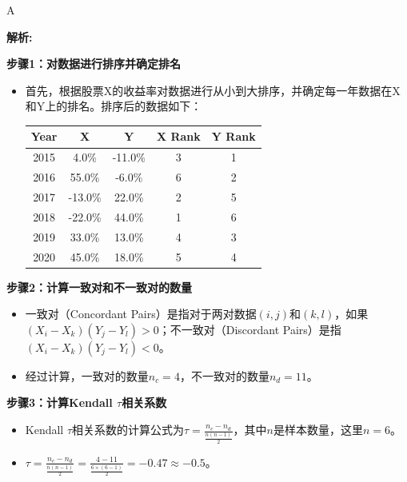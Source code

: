 \documentclass{article}
\newenvironment{explanation}
{\textbf{解析:}\par}
{\par}
\begin{document}
        \begin{correctanswer}
            A
        \end{correctanswer}
        
        \begin{explanation}
        \textbf{步骤1：对数据进行排序并确定排名}
        \begin{itemize}
            \item 首先，根据股票X的收益率对数据进行从小到大排序，并确定每一年数据在X和Y上的排名。排序后的数据如下：
            \begin{center}
                \begin{tabular}{|c|c|c|c|c|}
                \hline
                Year & X & Y & X Rank & Y Rank \\
                \hline
                2015 & 4.0\% & -11.0\% & 3 & 1 \\
                \hline
                2016 & 55.0\% & -6.0\% & 6 & 2 \\
                \hline
                2017 & -13.0\% & 22.0\% & 2 & 5 \\
                \hline
                2018 & -22.0\% & 44.0\% & 1 & 6 \\
                \hline
                2019 & 33.0\% & 13.0\% & 4 & 3 \\
                \hline
                2020 & 45.0\% & 18.0\% & 5 & 4 \\
                \hline
                \end{tabular}
            \end{center}
        \end{itemize}
        \textbf{步骤2：计算一致对和不一致对的数量}
        \begin{itemize}
            \item 一致对（Concordant Pairs）是指对于两对数据$(i, j)$和$(k, l)$，如果$(X_i - X_k)(Y_j - Y_l)>0$；不一致对（Discordant Pairs）是指$(X_i - X_k)(Y_j - Y_l)<0$。
            \item 经过计算，一致对的数量$n_c = 4$，不一致对的数量$n_d = 11$。
        \end{itemize}
        \textbf{步骤3：计算Kendall $\tau$相关系数}
        \begin{itemize}
            \item Kendall $\tau$相关系数的计算公式为$\tau=\frac{n_c - n_d}{\frac{n(n - 1)}{2}}$，其中$n$是样本数量，这里$n = 6$。
            \item $\tau=\frac{n_c - n_d}{\frac{n(n - 1)}{2}}=\frac{4 - 11}{\frac{6\times(6 - 1)}{2}}=-0.47\approx -0.5$。
        \end{itemize}
        \end{explanation}
        
\end{document}
